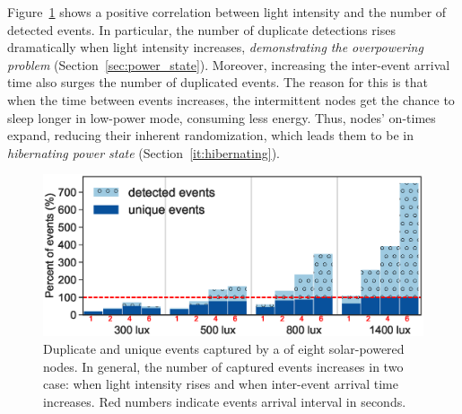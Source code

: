 Figure~\ref{fig:events_detection_rate} shows a positive correlation between light intensity and the number of detected events. In particular, the number of duplicate detections rises dramatically when light intensity increases, \emph{demonstrating the overpowering problem} (Section~\ref{sec:power_state}). Moreover, increasing the inter-event arrival time also surges the number of duplicated events. The reason for this is that when the time between events increases, the intermittent nodes get the chance to sleep longer in low-power mode, consuming less energy. Thus, nodes' on-times expand, reducing their inherent randomization, which leads them to be in \textit{hibernating power state} (Section~\ref{it:hibernating}).  


\begin{figure}[t!]
		\centering
	    \includegraphics[width=\columnwidth]{figures/regular_events_capture_rate_2.eps}
		\caption{Duplicate and unique events captured by a \fullcim of eight solar-powered nodes. In general, the number of captured events increases in two case: when light intensity rises and when inter-event arrival time increases. 
         Red numbers indicate events arrival interval in seconds.
         }
    	\label{fig:events_detection_rate}
\end{figure} 

